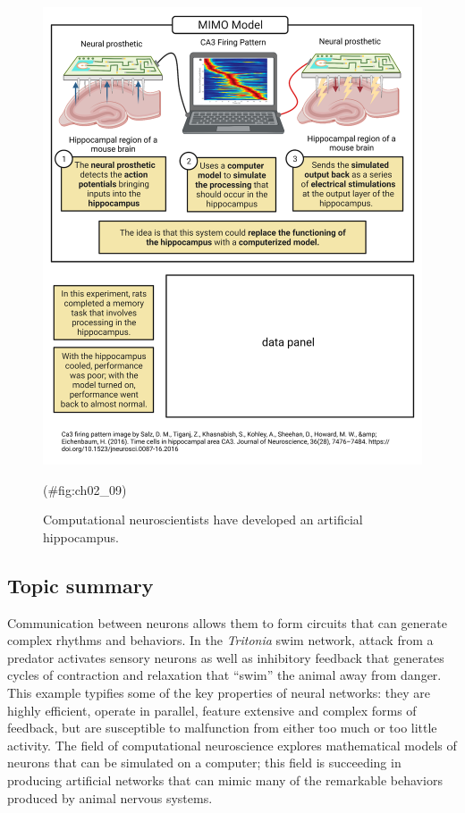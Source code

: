 \documentclass[
]{book}
\begin{document}
\begin{figure}

{\centering \includegraphics[width=0.8\linewidth]{images/ch02/02_09} 

}

\caption{Computational neuroscientists have developed an artificial hippocampus.}(\#fig:ch02_09)
\end{figure}

\hypertarget{topic-summary-1}{%
\subsection{Topic summary}\label{topic-summary-1}}

Communication between neurons allows them to form circuits that can generate complex rhythms and behaviors. In the \emph{Tritonia} swim network, attack from a predator activates sensory neurons as well as inhibitory feedback that generates cycles of contraction and relaxation that ``swim'' the animal away from danger. This example typifies some of the key properties of neural networks: they are highly efficient, operate in parallel, feature extensive and complex forms of feedback, but are susceptible to malfunction from either too much or too little activity. The field of computational neuroscience explores mathematical models of neurons that can be simulated on a computer; this field is succeeding in producing artificial networks that can mimic many of the remarkable behaviors produced by animal nervous systems.
\end{document}
